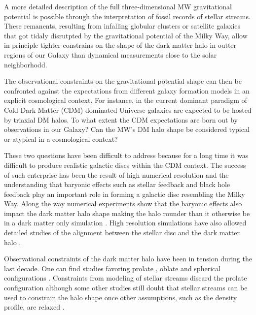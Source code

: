 \documentclass[usenatbib]{mnras}
\begin{document}
A more detailed description of the full three-dimensional MW
gravitational potential is possible through the interpretation of 
fossil records of stellar streams.
These remanents, resulting from infalling globular clusters or
satellite galaxies that got tidaly disrutpted by the gravitational
potential of the Milky Way, allow in principle tighter constrains 
on the shape of the dark matter halo in outter regions of our Galaxy
\citep{1998ApJ...495..297J,1999MNRAS.307..495H, 1999MNRAS.307..877T}
than dynamical measurements close to the solar neighborhodd.

The observational constraints on the gravitational potential shape can then
be confronted against the expectations from different galaxy formation
models in an explicit cosmological context.
For instance, in the current dominant paradigm of Cold Dark Matter
(CDM) dominated Universe galaxies are expected to be hosted by
triaxial DM halos. To what extent the CDM expectations are born out by
observations in our Galaxy? Can the MW's DM halo shape be considered
typical or atypical in a cosmological context?


These two questions have been difficult to address because for a long
time it was difficult to produce realistic galactic discs within the
CDM context.
The success of such enterprise has been the result of high numerical
resolution and the understanding that baryonic effects such as stellar
feedback and black hole feedback play an important role in forming a
galactic disc resembling the Milky Way.
Along the way numerical experiments show that the baryonic effects also impact
the dark matter halo shape making the halo rounder than it otherwise
be in a dark matter only simulation
\citep{Dubinski94,Debattista08,Kazantzidis10,Abadi10,Bryan13,Chua19,Artale19}. 
High resolution simulations have also allowed detailed studies of the
alignment between the stellar disc and the dark matter halo
\citep{Bailin05,DeBuhr12,Debattista13,Gomez17}.





Observational constraints of the dark matter halo have been in
tension during the last decade. 
One can find studies favoring prolate
\citep{Banerjee_and_Chanda_2011,Bowden_et_al._2016},  oblate
\citep{LM10,Deg_and_Widrow_2013,Vera-Ciro_and_Helmi_2013} and
spherical configurations \citep{Bovy16}.  
Constraints from modeling of stellar streams discard the prolate
configuration \citep{LM10,Pearson_et_al._2015,Bovy16} although some other studies
still doubt that stellar streams can be used to constrain the halo
shape once other assumptions, such as the density profile, are relaxed
\citep{Ibata_et_al._2013}. 
\end{document}
